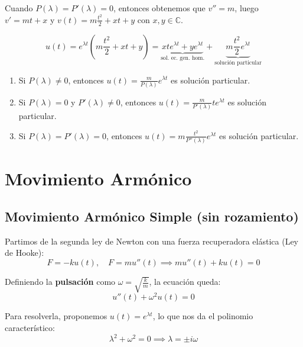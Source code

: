 {Cuando $P(\lambda) = P'(\lambda) = 0$, entonces obtenemos que $v'' = m$, luego $v' = mt + x$ y $v(t) = m\frac{t^2}{2} + xt + y$ con $x,y \in \mathbb{C}$. 

\[
    u(t) = e^{\lambda t} \left( m\frac{t^2}{2} + xt + y \right) = \underbrace{x t e^{\lambda t} + y e^{\lambda t}}_{\text{sol. ec. gen. hom.}} + \underbrace{m\frac{t^2}{2} e^{\lambda t}}_{\text{solución particular}}
\]

\begin{enumerate}
    \item Si $P(\lambda) \neq 0$, entonces $u(t) = \frac{m}{P(\lambda)} e^{\lambda t}$ es solución particular.
    \item Si $P(\lambda) = 0$ y $P'(\lambda) \neq 0$, entonces $u(t) = \frac{m}{P'(\lambda)} t e^{\lambda t}$ es solución particular.
    \item Si $P(\lambda) = P'(\lambda) = 0$, entonces $u(t) = m\frac{t^2}{P''(\lambda)} e^{\lambda t}$ es solución particular.
\end{enumerate}

}



\section{Movimiento Armónico}

\subsection{Movimiento Armónico Simple (sin rozamiento)}

Partimos de la segunda ley de Newton con una fuerza recuperadora elástica (Ley de Hooke):
\[
    F = -k u(t), \quad F = m u''(t) \implies m u''(t) + k u(t) = 0
\]

Definiendo la \textbf{pulsación} como $\omega = \sqrt{\frac{k}{m}}$, la ecuación queda:
\[
    u''(t) + \omega^2 u(t) = 0
\]

Para resolverla, proponemos $u(t) = e^{\lambda t}$, lo que nos da el polinomio característico:
\[
    \lambda^2 + \omega^2 = 0 \implies \lambda = \pm i \omega
\]


